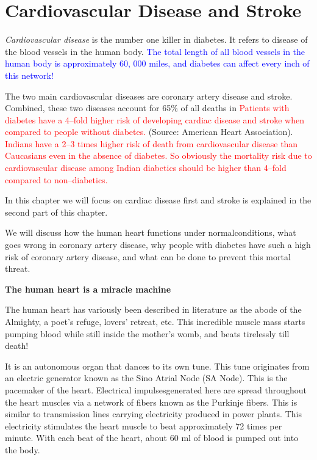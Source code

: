 \chapter{Cardiovascular Disease and Stroke}\label{chap12}

\textit{Cardiovascular disease} is the number one killer in diabetes. It refers to disease of the blood vessels in the human body. \textcolor{blue}{The total length of all blood vessels in the human body is approximately 60, 000 miles, and diabetes can affect every inch of this network!}

The two main cardiovascular diseases are coronary artery disease and stroke. Combined, these two diseases account for 65\% of all deaths in \textcolor{red}{Patients with diabetes have a 4–fold higher risk of developing cardiac disease and stroke when compared to people without diabetes.} (Source: American Heart Association). \textcolor{red}{Indians have a 2–3 times higher risk of death from cardiovascular disease than Caucasians even in the absence of diabetes. So obviously the mortality risk due to cardiovascular disease among Indian diabetics should be higher than 4–fold compared to non–diabetics.}

In this chapter we will focus on cardiac disease first and stroke is explained in the second part of this chapter.

We will discuss how the human heart functions under normal\break conditions, what goes wrong in coronary artery disease, why people with diabetes have such a high risk of coronary artery disease, and what can be done to prevent this mortal threat.

\noindent\textbf{The human heart is a miracle machine}

The human heart has variously been described in literature as the abode of the Almighty, a poet’s refuge, lovers’ retreat, etc. This incre\-dible muscle mass starts pumping blood while still inside the mother’s womb, and beats tirelessly till death!

It is an autonomous organ that dances to its own tune. This tune originates from an electric generator known as the Sino Atrial Node (SA Node). This is the pacemaker of the heart. Electrical impulses\break generated here are spread throughout the heart muscles via a network of fibers known as the Purkinje fibers. This is similar to trans\-mission lines carrying electricity produced in power plants. This electri\-city stimulates the heart muscle to beat approximately 72 times per minute. With each beat of the heart, about 60 ml of blood is pumped out into the body.

